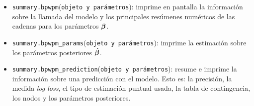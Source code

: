 \documentclass[../../Main/Main.tex]{subfiles}
\begin{document}
\begin{itemize}[label = {}]
	\item \verb|summary.bpwpm|(\verb|objeto y parámetros|): imprime en pantalla la información sobre la llamada del modelo y los principales resúmenes numéricos de las cadenas para los parámetros $\bm{\beta}$.
	\item \verb|summary.bpwpm_params|(\verb|objeto y parámetros|): imprime la estimación sobre los parámetros posteriores $\hat{\bm{\beta}}$.
	\item \verb|summary.bpwpm_prediction|(\verb|objeto y parámetros|): resume e imprime la información sobre una predicción con el modelo. Esto es: la precisión, la medida \textit{log-loss}, el tipo de estimación puntual usada, la tabla de contingencia, los nodos y los parámetros posteriores. 
\end{itemize}
\end{document}
